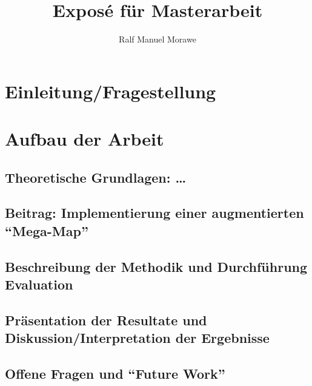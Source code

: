 \documentclass[a4paper]{scrartcl}
\begin{document}
	
\author{Ralf Manuel Morawe}
\title{Exposé für Masterarbeit}
\maketitle

\section{Einleitung/Fragestellung}
\section{Aufbau der Arbeit}
\subsection{Theoretische Grundlagen: \ldots}
\subsection{Beitrag: Implementierung einer augmentierten \enquote{Mega-Map}}
\subsection{Beschreibung der Methodik und Durchführung Evaluation}
\subsection{Präsentation der Resultate und Diskussion/Interpretation der Ergebnisse}
\subsection{Offene Fragen und \enquote{Future Work}}

\printbibliography[nottype=online]
\printbibliography[title={Online Referenzen}, type=online]
\end{document}
